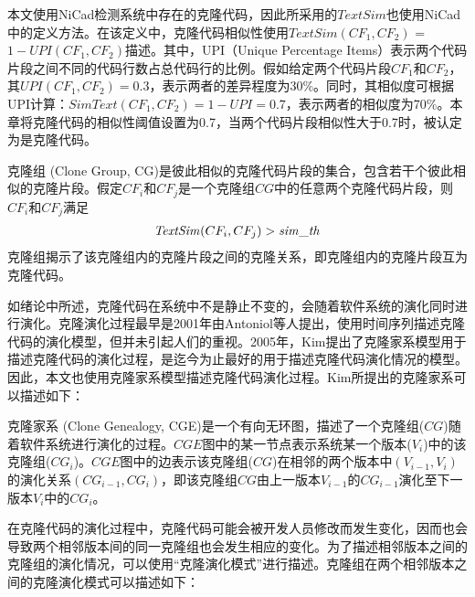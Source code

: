 本文使用NiCad\cite{roy2008nicad}检测系统中存在的克隆代码，因此所采用的$\mathit{TextSim}$也使用NiCad中的定义方法。在该定义中，克隆代码相似性使用$\mathit{TextSim}(CF_1, CF_2)$ = $1 - \mathit{UPI}(CF_1, CF_2)$描述。其中，UPI（Unique Percentage Items）表示两个代码片段之间不同的代码行数占总代码行的比例。假如给定两个代码片段$CF_1$和$CF_2$，其$UPI(CF_1,CF_2)=0.3$，表示两者的差异程度为30\%。同时，其相似度可根据UPI计算：$\mathit{SimText} (CF_1,CF_2) = 1- UPI = 0.7$，表示两者的相似度为70\%。本章将克隆代码的相似性阈值设置为0.7，当两个代码片段相似性大于0.7时，被认定为是克隆代码。

\begin{definition}[克隆组]
\label {def-clonegroup}
克隆组 (Clone Group, CG)是彼此相似的克隆代码片段的集合，包含若干个彼此相似的克隆片段。假定$CF_i$和$CF_j$是一个克隆组$CG$中的任意两个克隆代码片段，则$CF_i$和$CF_j$满足
\begin{equation} 
  \begin{array}[t]{c}
    \mathit{TextSim}(CF_i, CF_j) > \mathit{sim\_th} \\
  \end{array}
\end{equation}
克隆组揭示了该克隆组内的克隆片段之间的克隆关系，即克隆组内的克隆片段互为克隆代码。
\end {definition}

如绪论中所述，克隆代码在系统中不是静止不变的，会随着软件系统的演化同时进行演化。克隆演化过程最早是2001年由Antoniol等人提出，使用时间序列描述克隆代码的演化模型\cite{antoniol2001modeling}，但并未引起人们的重视。2005年，Kim提出了克隆家系模型用于描述克隆代码的演化过程，是迄今为止最好的用于描述克隆代码演化情况的模型\cite{kim2005empirical}。因此，本文也使用克隆家系模型描述克隆代码演化过程。Kim所提出的克隆家系可以描述如下：

\begin{definition}[克隆家系]
\label{def-clonegenealogy}
克隆家系 (Clone Genealogy, CGE)是一个有向无环图，描述了一个克隆组($CG$)随着软件系统进行演化的过程。$CGE$图中的某一节点表示系统某一个版本($V_i$)中的该克隆组($CG_i$)。$CGE$图中的边表示该克隆组($CG$)在相邻的两个版本中$(V_{i-1},V_i )$的演化关系$(CG_{i-1},CG_{i})$，即该克隆组$CG$由上一版本$V_{i-1}$的$CG_{i-1}$演化至下一版本$V_{i}$中的$CG_{i}$。
\end{definition} 

在克隆代码的演化过程中，克隆代码可能会被开发人员修改而发生变化，因而也会导致两个相邻版本间的同一克隆组也会发生相应的变化。为了描述相邻版本之间的克隆组的演化情况，可以使用“克隆演化模式”进行描述。克隆组在两个相邻版本之间的克隆演化模式可以描述如下：

